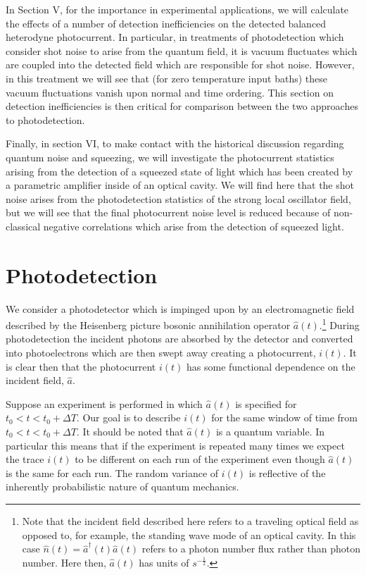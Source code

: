 \documentclass[12pt]{article}
\begin{document}
In Section V, for the importance in experimental applications, we will calculate the effects of a number of detection inefficiencies on the detected balanced heterodyne photocurrent. In particular, in treatments of photodetection which consider shot noise to arise from the quantum field, it is vacuum fluctuates which are coupled into the detected field which are responsible for shot noise. However, in this treatment we will see that (for zero temperature input baths) these vacuum fluctuations vanish upon normal and time ordering. This section on detection inefficiencies is then critical for comparison between the two approaches to photodetection.

Finally, in section VI, to make contact with the historical discussion regarding quantum noise and squeezing, we will investigate the photocurrent statistics arising from the detection of a squeezed state of light which has been created by a parametric amplifier inside of an optical cavity. We will find here that the shot noise arises from the photodetection statistics of the strong local oscillator field, but we will see that the final photocurrent noise level is reduced because of non-classical negative correlations  which arise from the detection of squeezed light.

\section{Photodetection}

We consider a photodetector which is impinged upon by an electromagnetic field described by the Heisenberg picture bosonic annihilation operator $\hat{a}(t)$.\footnote{Note that the incident field described here refers to a traveling optical field as opposed to, for example, the standing wave mode of an optical cavity. In this case $\hat{n}(t) = \hat{a}^{\dag}(t) \hat{a}(t)$ refers to a photon number flux rather than photon number. Here then, $\hat{a}(t)$ has units of $s^{-\frac{1}{2}}$.} During photodetection the incident photons are absorbed by the detector and converted into photoelectrons which are then swept away creating a photocurrent, $i(t)$. It is clear then that the photocurrent $i(t)$ has some functional dependence on the incident field, $\hat{a}$.

Suppose an experiment is performed in which $\hat{a}(t)$ is specified for $t_0<t<t_0+\Delta T$. Our goal is to describe $i(t)$ for the same window of time from $t_0<t<t_0+\Delta T$. It should be noted that $\hat{a}(t)$ is a quantum variable. In particular this means that if the experiment is repeated many times we expect the trace $i(t)$ to be different on each run of the experiment even though $\hat{a}(t)$ is the same for each run. The random variance of $i(t)$ is reflective of the inherently probabilistic nature of quantum mechanics.
\end{document}
